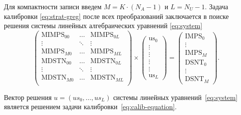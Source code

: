 Для компактности записи введем $M = K \cdot \left(N_A-1\right)$ и $L = N_U - 1$. Задача калибровки \eqref{eq:strat-greg}
после всех преобразований заключается в поиске решения системы линейных алгебраических уравнений \eqref{eq:system}
\begin{equation}
    \left(
        \begin{array}{ccc}
            \text{MIMPS}_{00} & \dots & \text{MIMPS}_{0L} \\
            \vdots & \ddots & \vdots \\
            \text{MIMPS}_{M0} & \dots & \text{MIMPS}_{ML} \\
            \text{MDSTN}_{00} & \dots & \text{MDSTN}_{0L} \\
            \vdots & \ddots & \vdots \\
            \text{MDSTN}_{M0} & \dots & \text{MDSTN}_{ML} \\
        \end{array}
    \right)\times
    \left(
        \begin{array}{c}
            \text{us}_{0} \\
            \vdots \\
            \vdots \\
            \vdots \\
            \vdots \\
            \text{us}_{L}
        \end{array}
    \right) = 
    \left(
        \begin{array}{c}
            \text{IMPS}_0 \\
            \vdots \\
            \text{IMPS}_M \\
            \text{DSNT}_0 \\
            \vdots \\
            \text{DSNT}_M
        \end{array}
    \right).
    \label{eq:system}
\end{equation}

Вектор решения $u = \left(us_0, \dots, us_L \right)$ системы линейных уравнений~\eqref{eq:system} является решением задачи 
калибровки~\eqref{eq:calib-equation}.

